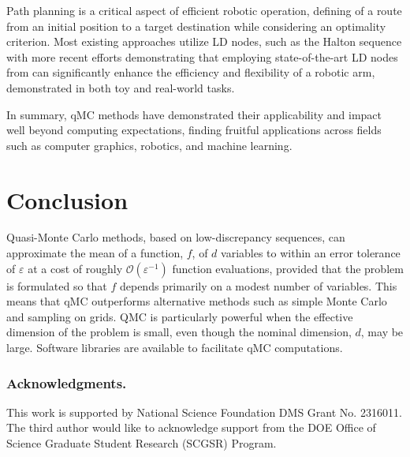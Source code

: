 \documentclass{svproc}
\begin{document}
Path planning is a critical aspect of efficient robotic operation, defining of a route from an initial position to a target destination while considering an optimality criterion. Most existing approaches utilize LD nodes, such as the Halton sequence \cite{veldel14,zhong24} with more recent efforts \cite{chahine24} demonstrating that employing state-of-the-art LD nodes from \cite{ruschkirk24} can significantly enhance the efficiency and flexibility of a robotic arm, demonstrated in both toy and real-world tasks.

In summary, qMC methods have demonstrated their applicability and impact well beyond computing expectations, finding fruitful applications across fields such as computer graphics, robotics, and machine learning.



\section{Conclusion} \label{sec:conclusion}
Quasi-Monte Carlo methods, based on low-discrepancy sequences, can approximate the mean of a function, $f$, of $d$ variables to within an error tolerance of $\varepsilon$ at a cost of roughly $\mathcal{O}(\varepsilon^{-1})$ function evaluations, provided that the problem is formulated so that $f$ depends primarily on a modest number of variables.  This means that qMC outperforms alternative methods such as simple Monte Carlo and sampling on grids.  QMC is particularly powerful when the effective dimension of the problem is small, even though the nominal dimension, $d$, may be large.  Software libraries are available to facilitate qMC computations.


\subsubsection*{Acknowledgments.} This work is supported by National Science Foundation DMS Grant No. 2316011. The third author would like to acknowledge support from the DOE Office of Science Graduate Student Research (SCGSR) Program.




\end{document}
